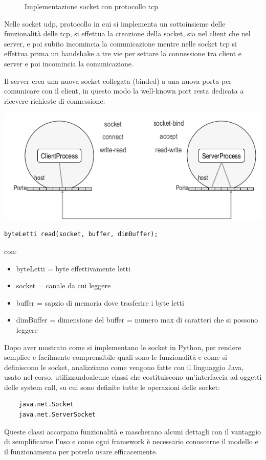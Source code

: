 \documentclass[a4paper,12pt, oneside]{book}
\begin{document}
\begin{figure}
    \caption{Implementazione socket con protocollo tcp}\label{tcpSocket}
    \inputminted{python}{code/tcpClient.py}
    \inputminted{python}{code/tcpServer.py}
\end{figure}
Nelle socket udp, protocollo in cui si implementa un sottoinsieme delle funzionalità delle tcp, 
si effettua la creazione della socket, sia nel client che nel server, e poi subito incomincia la 
comunicazione mentre nelle socket tcp si effettua prima un handshake a tre vie per settare la connessione
tra client e server e poi incomincia la comunicazione.

Il server crea una nuova socket collegata (binded) a una nuova porta per comunicare con il client,
in questo modo la well-known port resta dedicata a ricevere richieste di connessione:
\begin{center}
	\includegraphics[scale=3]{img/sc4.png}
\end{center}
\begin{verbatim}
byteLetti read(socket, buffer, dimBuffer);
\end{verbatim}
con:
\begin{itemize}
	\item byteLetti = byte effettivamente letti
	\item socket = canale da cui leggere
	\item buffer = sapzio di memoria dove trasferire i byte letti
	\item dimBuffer = dimensione del buffer = numero max di caratteri che si possono leggere
\end{itemize}

Dopo aver mostrato come si implementano le socket in Python, per rendere semplice e facilmente comprensibile
quali sono le funzionalità e come si definiscono le socket, analizziamo come vengono fatte con il linguaggio
Java, usato nel corso, utilizzandoalcune classi che costituiscono un'interfaccia ad oggetti 
delle system call, su cui sono definite tutte le operazioni delle socket:
\begin{verbatim}
    java.net.Socket
    java.net.ServerSocket
\end{verbatim}
Queste classi accorpano funzionalità e mascherano alcuni dettagli con il vantaggio di semplificarne l'uso
e come ogni framework è necessario conoscerne il modello e il funzionamento per poterlo usare efficacemente. 
\end{document}
